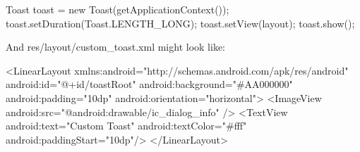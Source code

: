 \documentclass{report}
\begin{document}
\begin{itemize}
\begin{javacode}
                Toast toast = new Toast(getApplicationContext());
                toast.setDuration(Toast.LENGTH_LONG);
                toast.setView(layout);
                toast.show();
            \end{javacode}
            \bigbreak \noindent 
            And res/layout/custom\_toast.xml might look like:
            \bigbreak \noindent 
            \begin{xmlcode}
                <LinearLayout xmlns:android="http://schemas.android.com/apk/res/android"
                    android:id="@+id/toastRoot"
                    android:background="#AA000000"
                    android:padding="10dp"
                    android:orientation="horizontal">
                    <ImageView android:src="@android:drawable/ic_dialog_info" />
                    <TextView
                        android:text="Custom Toast"
                        android:textColor="#fff"
                        android:paddingStart="10dp"/>
                </LinearLayout>
            \end{xmlcode}
    \end{itemize}

    \pagebreak 
\end{document}
